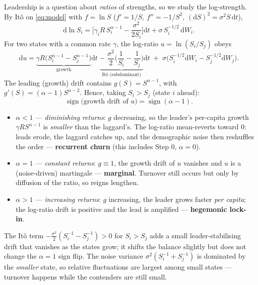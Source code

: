 \documentclass[11pt]{article}
\newcommand{\dd}{\mathrm{d}}
\begin{document}
Leadership is a question about \emph{ratios} of strengths, so we study the
log-strength. By It\^o on \eqref{eq:model} with $f=\ln S$
($f'=1/S,\ f''=-1/S^2,\ (\dd S)^2=\sigma^2S\,\dd t$),
\begin{equation}
\dd\ln S_i=\Big[\gamma_i R\,S_i^{\alpha-1}-\frac{\sigma^2}{2S_i}\Big]\dd t
            +\sigma\,S_i^{-1/2}\,\dd W_i .
\label{eq:dlnS}
\end{equation}
For two states with a common rate $\gamma$, the log-ratio $u=\ln(S_i/S_j)$ obeys
\begin{equation}
\dd u=\underbrace{\gamma R\big(S_i^{\alpha-1}-S_j^{\alpha-1}\big)}_{\text{growth}}\dd t
      \;\underbrace{-\;\frac{\sigma^2}{2}\Big(\frac1{S_i}-\frac1{S_j}\Big)}_{\text{It\^o (subdominant)}}\dd t
      \;+\;\sigma\big(S_i^{-1/2}\dd W_i-S_j^{-1/2}\dd W_j\big).
\label{eq:du}
\end{equation}
The leading (growth) drift contains $g(S)=S^{\alpha-1}$, with
$g'(S)=(\alpha-1)S^{\alpha-2}$. Hence, taking $S_i>S_j$ (state $i$ ahead):
\begin{equation}
\operatorname{sign}\big(\text{growth drift of }u\big)
=\operatorname{sign}(\alpha-1).
\end{equation}
\begin{itemize}
\item $\boxed{\alpha<1}$ — \emph{diminishing returns}: $g$ decreasing, so the
  leader's per-capita growth $\gamma R S^{\alpha-1}$ is \emph{smaller} than the
  laggard's. The log-ratio mean-reverts toward $0$: leads erode, the laggard
  catches up, and the demographic noise then reshuffles the order — \textbf{recurrent
  churn} (this includes Step 0, $\alpha=0$).
\item $\boxed{\alpha=1}$ — \emph{constant returns}: $g\equiv1$, the growth drift
  of $u$ vanishes and $u$ is a (noise-driven) martingale — \textbf{marginal}.
  Turnover still occurs but only by diffusion of the ratio, so reigns lengthen.
\item $\boxed{\alpha>1}$ — \emph{increasing returns}: $g$ increasing, the leader
  grows faster \emph{per capita}; the log-ratio drift is positive and the lead is
  amplified — \textbf{hegemonic lock-in}.
\end{itemize}
The It\^o term $-\tfrac{\sigma^2}{2}(S_i^{-1}-S_j^{-1})>0$ for $S_i>S_j$ adds a
small leader-stabilising drift that vanishes as the states grow; it shifts the
balance slightly but does not change the $\alpha=1$ sign flip. The noise variance
$\sigma^2(S_i^{-1}+S_j^{-1})$ is dominated by the \emph{smaller} state, so
relative fluctuations are largest among small states — turnover happens while the
contenders are still small.
\end{document}

